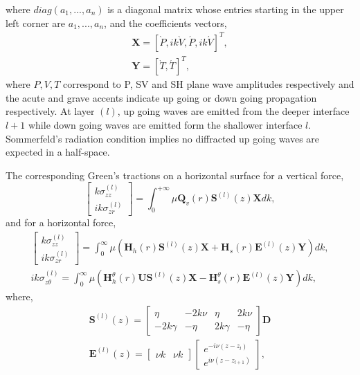 \documentclass[preprint,5p,times]{elsarticle}
\begin{document}
where $diag(a_1,...,a_n)$ is a diagonal matrix whose entries starting in the upper left corner are $a_1,...,a_n$, and the coefficients vectors,
\begin{equation}
\begin{aligned}
	\boldsymbol{X} = \left[\grave{P},ik\grave{V},\acute{P},ik\acute{V} \right]^T,\\
	\boldsymbol{Y} = \left[\grave{T},\acute{T}\right]^T,
	\end{aligned}
	\label{eqIncognitas}
\end{equation} 
where $P,V,T$ correspond to P, SV and SH plane wave amplitudes respectively and the acute and grave accents indicate up going or down going propagation respectively. At layer $(l)$, up going waves are emitted from the deeper interface $l+1$ while down going waves are emitted form the shallower interface $l$. Sommerfeld's radiation condition implies no diffracted up going waves are expected in a half-space. 

The corresponding Green's tractions on a horizontal surface for a vertical force,
\begin{equation}
\left[\begin{matrix} k \sigma_{zz}^{(l)} \\
ik \sigma_{zr}^{(l)} \end{matrix} \right] = \int_{0}^{+ \infty} \mu \boldsymbol{Q}_v(r) \boldsymbol{S}^{(l)}(z) \boldsymbol{X} dk,
\label{eqTdifver}
\end{equation}
and for a horizontal force,
\begin{equation}
\begin{aligned}
\left[\begin{matrix} k \sigma_{zz}^{(l)} \\
ik \sigma_{zr}^{(l)} \end{matrix} \right] = \int_{0}^{\infty} \mu \left(\boldsymbol{H}_h(r) \boldsymbol{S}^{(l)}(z)\boldsymbol{X} + \boldsymbol{H}_s(r) \boldsymbol{E}^{(l)}(z) \boldsymbol{Y}\right) dk, \\
ik \sigma_{z \theta}^{(l)} = \int_{0}^{\infty} \mu \left(\boldsymbol{H}_h^\theta(r) \boldsymbol{U}\boldsymbol{S}^{(l)}(z)\boldsymbol{X} - \boldsymbol{H}_s^\theta(r) \boldsymbol{E}^{(l)}(z)\boldsymbol{Y} \right) dk,
\end{aligned}
\label{eqTdifhor}
\end{equation}
where,
\begin{equation}
\begin{aligned}
\boldsymbol{S}^{(l)}(z) = \left[\begin{matrix}
\eta & -2k\nu & \eta & 2k\nu \\
-2k\gamma & -\eta & 2k\gamma & -\eta 
\end{matrix} \right] \boldsymbol{D}\\
\boldsymbol{E}^{(l)}(z) = \left[\begin{matrix}
\nu k & \nu k \end{matrix} \right] \left[\begin{matrix}
e^{-i \nu (z-z_l)} \\ e^{i \nu (z-z_{l+1})}
\end{matrix} \right],
\end{aligned}
\end{equation}
\end{document}
